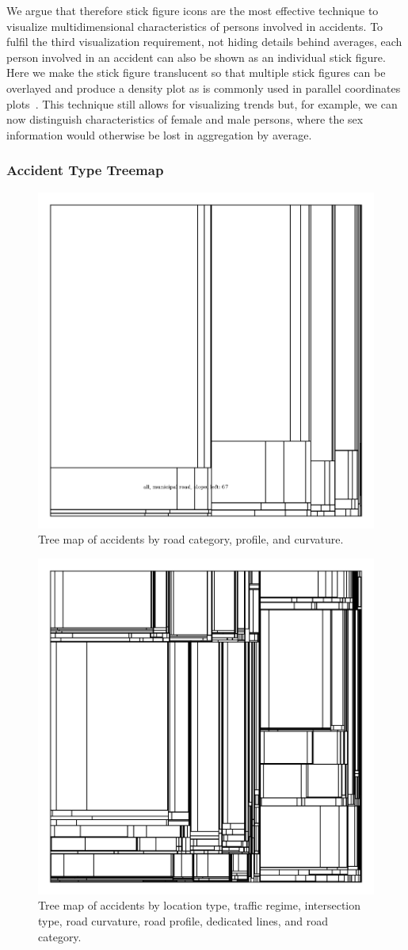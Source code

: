 We argue that therefore stick figure icons are the most effective technique to visualize multidimensional characteristics of persons involved in accidents.
To fulfil the third visualization requirement, not hiding details behind averages, each person involved in an accident can also be shown as an individual stick figure. Here we make the stick figure translucent so that multiple stick figures can be overlayed and produce a density plot as is commonly used in parallel coordinates plots~\cite{Wegman1990}.
This technique still allows for visualizing trends but, for example, we can now distinguish characteristics of female and male persons, where the sex information would otherwise be lost in aggregation by average.

\subsubsection{Accident Type Treemap}
\begin{figure}
    \centering
    \includegraphics[width=0.6\linewidth]{figures/tree-treemap-road-category-road-profile-road-curvature}
    \caption{Tree map of accidents by road category, profile, and curvature.}
    \label{figure-treemap-road-category-profile-curvature}
\end{figure}
\begin{figure}
    \centering
    \includegraphics[width=0.6\linewidth]{figures/tree-treemap-location-type-traffic-regime-intersection-type-road-curvature-road-profile-dedicated-line-road-category}
    \caption{Tree map of accidents by location type, traffic regime, intersection type, road curvature, road profile, dedicated lines, and road category.}
    \label{figure-treemap-many}
\end{figure}
